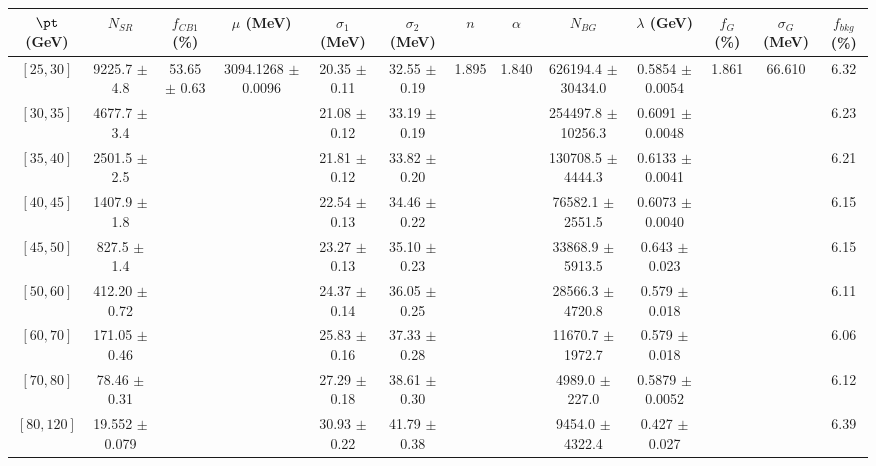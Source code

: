 \begin{tabular}{c||c|c|c|c|c|c|c|c|c|c|c||c}
$\pt$ (GeV) & $N_{SR}$ & $f_{CB1}$ (\%) & $\mu$ (MeV) & $\sigma_1$ (MeV) & $\sigma_2$ (MeV) & $n$ & $\alpha$ & $N_{BG}$ & $\lambda$ (GeV) & $f_G$ (\%) & $\sigma_G$ (MeV) & $f_{bkg}$ (\%) \\
\hline
$[25, 30]$ & 9225.7 $\pm$ 4.8 & \multirow{9}{*}{53.65 $\pm$ 0.63} & \multirow{9}{*}{3094.1268 $\pm$ 0.0096} & 20.35 $\pm$ 0.11 & 32.55 $\pm$ 0.19 & \multirow{9}{*}{1.895} & \multirow{9}{*}{1.840} & 626194.4 $\pm$ 30434.0 & 0.5854 $\pm$ 0.0054 & \multirow{9}{*}{1.861} & \multirow{9}{*}{66.610} & 6.32\\
$[30, 35]$ & 4677.7 $\pm$ 3.4 &  &  & 21.08 $\pm$ 0.12 & 33.19 $\pm$ 0.19 &  &  & 254497.8 $\pm$ 10256.3 & 0.6091 $\pm$ 0.0048 &  &  & 6.23\\
$[35, 40]$ & 2501.5 $\pm$ 2.5 &  &  & 21.81 $\pm$ 0.12 & 33.82 $\pm$ 0.20 &  &  & 130708.5 $\pm$ 4444.3 & 0.6133 $\pm$ 0.0041 &  &  & 6.21\\
$[40, 45]$ & 1407.9 $\pm$ 1.8 &  &  & 22.54 $\pm$ 0.13 & 34.46 $\pm$ 0.22 &  &  & 76582.1 $\pm$ 2551.5 & 0.6073 $\pm$ 0.0040 &  &  & 6.15\\
$[45, 50]$ & 827.5 $\pm$ 1.4 &  &  & 23.27 $\pm$ 0.13 & 35.10 $\pm$ 0.23 &  &  & 33868.9 $\pm$ 5913.5 & 0.643 $\pm$ 0.023 &  &  & 6.15\\
$[50, 60]$ & 412.20 $\pm$ 0.72 &  &  & 24.37 $\pm$ 0.14 & 36.05 $\pm$ 0.25 &  &  & 28566.3 $\pm$ 4720.8 & 0.579 $\pm$ 0.018 &  &  & 6.11\\
$[60, 70]$ & 171.05 $\pm$ 0.46 &  &  & 25.83 $\pm$ 0.16 & 37.33 $\pm$ 0.28 &  &  & 11670.7 $\pm$ 1972.7 & 0.579 $\pm$ 0.018 &  &  & 6.06\\
$[70, 80]$ & 78.46 $\pm$ 0.31 &  &  & 27.29 $\pm$ 0.18 & 38.61 $\pm$ 0.30 &  &  & 4989.0 $\pm$ 227.0 & 0.5879 $\pm$ 0.0052 &  &  & 6.12\\
$[80, 120]$ & 19.552 $\pm$ 0.079 &  &  & 30.93 $\pm$ 0.22 & 41.79 $\pm$ 0.38 &  &  & 9454.0 $\pm$ 4322.4 & 0.427 $\pm$ 0.027 &  &  & 6.39\\
\end{tabular}
